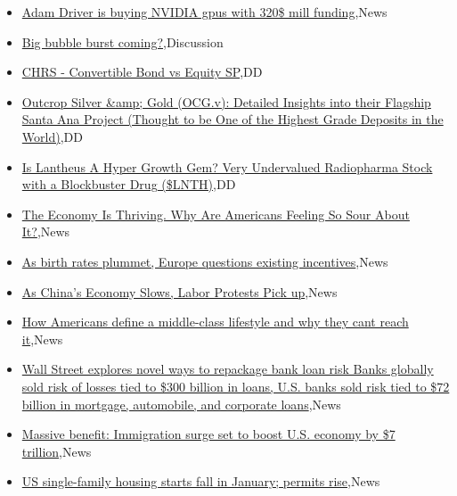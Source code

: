 \documentclass{article}%
\begin{document}
%
\begin{itemize}%
\item%
\href{https://reddit.com/r/wallstreetbets/comments/1aszwz5/adam\_driver\_is\_buying\_nvidia\_gpus\_with\_320\_mill/}{Adam Driver is buying NVIDIA gpus with 320\$ mill funding},News%
\item%
\href{https://reddit.com/r/wallstreetbets/comments/1asyz4u/big\_bubble\_burst\_coming/}{Big bubble burst coming?},Discussion%
\item%
\href{https://reddit.com/r/Baystreetbets/comments/1aszzto/chrs\_convertible\_bond\_vs\_equity\_sp/}{CHRS - Convertible Bond vs Equity SP},DD%
\item%
\href{https://reddit.com/r/Baystreetbets/comments/1asivoo/outcrop\_silver\_gold\_ocgv\_detailed\_insights\_into/}{Outcrop Silver \&amp; Gold (OCG.v): Detailed Insights into their Flagship Santa Ana Project (Thought to be One of the Highest Grade Deposits in the World)},DD%
\item%
\href{https://reddit.com/r/Baystreetbets/comments/1asfweh/is\_lantheus\_a\_hyper\_growth\_gem\_very\_undervalued/}{Is Lantheus A Hyper Growth Gem? Very Undervalued Radiopharma Stock with a Blockbuster Drug (\$LNTH)},DD%
\item%
\href{https://reddit.com/r/Economics/comments/1asxktt/the\_economy\_is\_thriving\_why\_are\_americans\_feeling/}{The Economy Is Thriving. Why Are Americans Feeling So Sour About It?},News%
\item%
\href{https://reddit.com/r/Economics/comments/1asuivr/as\_birth\_rates\_plummet\_europe\_questions\_existing/}{As birth rates plummet, Europe questions existing incentives},News%
\item%
\href{https://reddit.com/r/Economics/comments/1asovws/as\_chinas\_economy\_slows\_labor\_protests\_pick\_up/}{As China's Economy Slows, Labor Protests Pick up},News%
\item%
\href{https://reddit.com/r/Economics/comments/1ashjei/how\_americans\_define\_a\_middleclass\_lifestyle\_and/}{How Americans define a middle-class lifestyle  and why they cant reach it},News%
\item%
\href{https://reddit.com/r/Economics/comments/1asgsnf/wall\_street\_explores\_novel\_ways\_to\_repackage\_bank/}{Wall Street explores novel ways to repackage bank loan risk  Banks globally sold risk of losses tied to \$300 billion in loans, U.S. banks sold risk tied to \$72 billion in mortgage, automobile, and corporate loans},News%
\item%
\href{https://reddit.com/r/Economics/comments/1asfql6/massive\_benefit\_immigration\_surge\_set\_to\_boost\_us/}{Massive benefit: Immigration surge set to boost U.S. economy by \$7 trillion},News%
\item%
\href{https://reddit.com/r/Economics/comments/1asc088/us\_singlefamily\_housing\_starts\_fall\_in\_january/}{US single-family housing starts fall in January; permits rise},News%
\end{itemize}%
\end{document}
